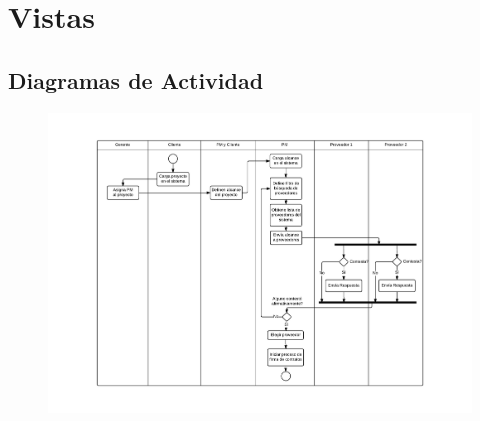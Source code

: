 \section{Vistas}





\subsection{Diagramas de Actividad}
\begin{figure}[H]
\includegraphics[width=\linewidth]{actividad.pdf}
\end{figure}

